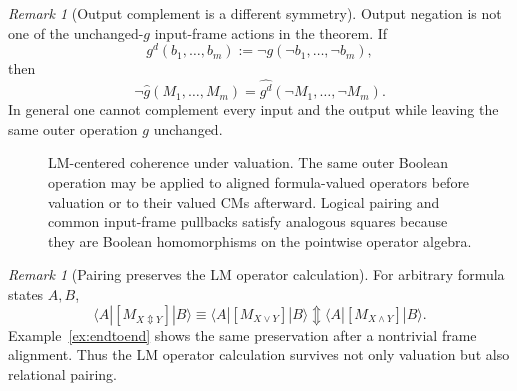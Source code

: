 \documentclass[11pt]{article}
\theoremstyle{definition}
\theoremstyle{remark}
\newtheorem{remark}[theorem]{Remark}
\newcommand{\xor}{\mathbin{\Updownarrow}}
\begin{document}
\begin{remark}[Output complement is a different symmetry]
Output negation is not one of the unchanged-$g$ input-frame actions in the theorem.  If
\[
 g^d(b_1,\ldots,b_m):=\neg g(\neg b_1,\ldots,\neg b_m),
\]
then
\[
 \neg\widehat g(M_1,\ldots,M_m)
 =\widehat{g^d}(\neg M_1,\ldots,\neg M_m).
\]
In general one cannot complement every input and the output while leaving the same outer operation $g$ unchanged.
\end{remark}

\begin{figure}[ht]
\centering
{}
\caption{LM-centered coherence under valuation.  The same outer Boolean operation may be applied to aligned formula-valued operators before valuation or to their valued CMs afterward.  Logical pairing and common input-frame pullbacks satisfy analogous squares because they are Boolean homomorphisms on the pointwise operator algebra.}
\label{fig:coherencesquare}
\end{figure}

\begin{remark}[Pairing preserves the LM operator calculation]
For arbitrary formula states $A,B$,
\[
 \langle A|[M_{X\Updownarrow Y}]|B\rangle
 \equiv
 \langle A|[M_{X\lor Y}]|B\rangle
 \xor
 \langle A|[M_{X\land Y}]|B\rangle.
\]
Example~\ref{ex:endtoend} shows the same preservation after a nontrivial frame alignment.  Thus the LM operator calculation survives not only valuation but also relational pairing.
\end{remark}
\end{document}
